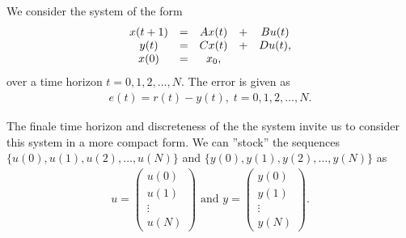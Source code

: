 We consider the system of the form 
\begin{align}
\label{eq:Intro:GP}
\begin{split}
&\begin{array}{c c c c c}
x(t+1) &= &A x(t)& + &B u(t)  \\
y ( t) &= &C x(t)&  + &D u(t),\\ 
x(0)& = &x_0, & &
\end{array}\\
\end{split}
\end{align}
over a time horizon $t = 0, 1, 2, \dots, N$.
The error is given as
\begin{align}
\label{eq:Intro:error}
e(t) = r(t) - y(t), \; t  = 0, 1, 2, \dots, N. 
\end{align}

The finale time horizon and discreteness of the the system invite us to consider this system in a more compact form. We can ''stock'' the sequences $\{u(0), u(1), u(2), \dots, u(N)\}$ and $\{y(0), y(1), y(2), \dots, y(N)\}$ as 
\begin{align*}
u = \begin{pmatrix}
u(0) \\ u(1) \\ \vdots \\ u(N)
\end{pmatrix} \text{ and }
y = \begin{pmatrix}
y(0) \\ y(1) \\ \vdots \\ y(N)
\end{pmatrix}. 
\end{align*}

